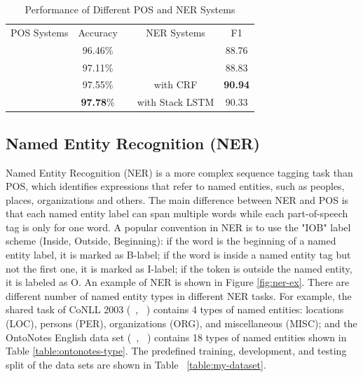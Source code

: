 \begin{table}[]
\centering
\caption{Performance of Different POS and NER Systems}
\label{table:my-performance}
\begin{tabular}{cclcc}
POS Systems       & Accuracy &  & NER Systems           & F1
\\ \cline{1-2} \cline{4-5} 
\text{\cite{mccallum2000maximum}} & 96.46\%                      &  & \text{\cite{florian2003named}}                 & 88.76                  \\
\text{\cite{collins2002discriminative}}    & 97.11\%                      &  & \text{\cite{huang2015bidirectional}}           & 88.83                  \\
\text{\cite{huang2015bidirectional}}       & 97.55\%                      &  & \text{\cite{lample2016neural}} with CRF        & \textbf{90.94}                 \\
\text{\cite{ling2015finding}}              & \textbf{97.78}\%                      &  & \text{\cite{lample2016neural}} with Stack LSTM & 90.33                 
\end{tabular}
\end{table}



\subsection{Named Entity Recognition (NER)}

Named Entity Recognition (NER) is a more complex sequence tagging task than POS, which identifies expressions
that refer to named entities, such as peoples, places, organizations and others. The main difference between NER and POS is that each named entity label can span multiple words while each part-of-speech tag is only for one word. A popular convention in NER is to use the "IOB" label scheme (Inside, Outside, Beginning): if the word is the beginning of a named entity label, it is marked as B-label; if the word is inside a named entity tag but not the first one, it is marked as I-label; if the token is outside the named entity, it is labeled as O. An example of NER is shown in Figure \ref{fig:ner-ex}. There are different number of named entity types in different NER tasks. For example, the shared task of CoNLL 2003 (~\citeauthor{tjong2003introduction}, ~\citeyear{tjong2003introduction}) contains 4 types of named entities: locations (LOC), persons (PER), organizations (ORG), and miscellaneous (MISC); and the OntoNotes English data set (~\citeauthor{hovy2006ontonotes}, ~\citeyear{hovy2006ontonotes}) contains 18 types of named entities shown in Table \ref{table:ontonotes-type}. The predefined training, development, and testing split of the data sets are shown in Table ~\ref{table:my-dataset}.

